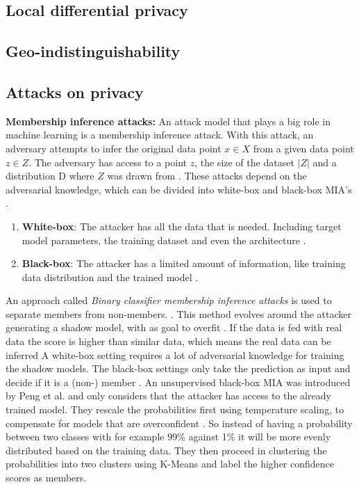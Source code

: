 \subsection{Local differential privacy}
\subsection{Geo-indistinguishability}
\subsection{Attacks on privacy}
\textbf{Membership inference attacks:}
An attack model that plays a big role in machine learning is a membership inference attack.
With this attack, an adversary attempts to infer the original data point $x \in X$ from a given data point $z \in Z$.
The adversary has access to a point $z$, the size of the dataset $|Z|$ and a distribution D where $Z$ was drawn from \citep{yeom_privacy_2018}.
These attacks depend on the adversarial knowledge, which can be divided into white-box and black-box MIA's \citep{hu_membership_2022}.
\begin{enumerate}
  \item \textbf{White-box}: The attacker has all the data that is needed. Including target model parameters, the training dataset and even the architecture \citep{hu_membership_2022}.
  \item \textbf{Black-box}: The attacker has a limited amount of information, like training data distribution and the trained model \citep{hu_membership_2022}.
\end{enumerate}

An approach called \textit{Binary classifier membership inference attacks} is used to separate members from non-members. \citep{hu_membership_2022}.
This method evolves around the attacker generating a shadow model, with as goal to overfit \citep{shokri_membership_2017}.
If the data is fed with real data the score is higher than similar data, which means the real data can be inferred \citep{shokri_membership_2017,jayaraman_evaluating_nodate}
A white-box setting requires a lot of adversarial knowledge for training the shadow models.
The black-box settings only take the prediction as input and decide if it is a (non-) member \citep{hu_membership_2022}.
An unsupervised black-box MIA was introduced by Peng et al. and only considers that the attacker has access to the already trained model.
They rescale the probabilities first using temperature scaling, to compensate for models that are overconfident \citep{peng_unsupervised_nodate}.
So instead of having a probability between two classes with for example 99\% against 1\% it will be more evenly distributed based on the training data.
They then proceed in clustering the probabilities into two clusters using K-Means and label the higher confidence scores as members.

